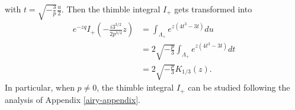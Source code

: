 \documentclass{article}
\theoremstyle{definition}
\newcommand{\laplace}{\mathcal{L}}
\theoremstyle{plain}
\newtheorem{lemma}[definition]{Lemma}
\begin{document}
with $t= \sqrt{-\frac{3}{p}} \frac{u}{2}$. Then the thimble integral $I_+$ gets transformed into 
\begin{align*}
    e^{-zq} I_+\left(-\tfrac{i 3^{3/2}}{2 p^{3/2}} z\right)&= \int_{\Lambda_+} e^{z (4t^3-3t)} du\\
    &= 2\sqrt{-\tfrac{p}{3}} \int_{\Lambda_+} e^{z (4t^3-3t)} dt \\
    &= 2\sqrt{-\tfrac{p}{3}} K_{1/3}(z). 
\end{align*}
In particular, when $p\neq 0$, the thimble integral $I_+$ can be studied following the analysis of Appendix \ref{airy-appendix}. 



\end{document}
